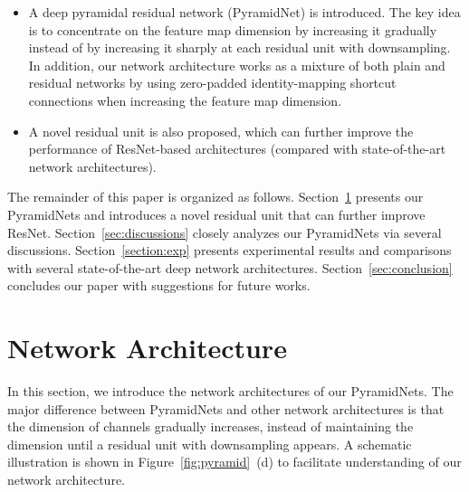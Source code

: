 \documentclass[10pt,twocolumn,letterpaper]{article}
\begin{document}
\begin{itemize}
\item A deep pyramidal residual network (PyramidNet) is introduced. The key idea is to concentrate on the feature map dimension by increasing it gradually instead of by increasing it sharply at each residual unit with downsampling. In addition, our network architecture works as a mixture of both plain and residual networks by using zero-padded identity-mapping shortcut connections when increasing the feature map dimension.
\item A novel residual unit is also proposed, which can further improve the performance of ResNet-based architectures (compared with state-of-the-art network architectures).


\end{itemize}

The remainder of this paper is organized as follows. Section~\ref{sec:architecture} presents our PyramidNets and introduces a novel residual unit that can further improve ResNet. Section~\ref{sec:discussions} closely analyzes our PyramidNets via several discussions. Section~\ref{section:exp} presents experimental results and comparisons with several state-of-the-art deep network architectures. Section~\ref{sec:conclusion} concludes our paper with suggestions for future works.

\section{Network Architecture}
\label{sec:architecture}
In this section, we introduce the network architectures of our PyramidNets. The major difference between PyramidNets and other network architectures is that the dimension of channels gradually increases, instead of maintaining the dimension until a residual unit with downsampling appears. A schematic illustration is shown in Figure~\ref{fig:pyramid}~(d) to facilitate understanding of our network architecture.
\end{document}
